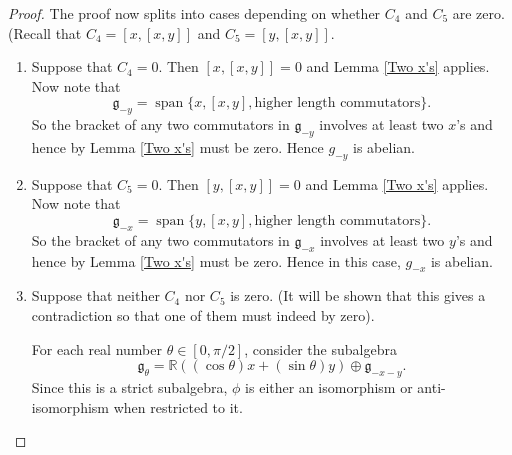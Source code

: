\documentclass[honours]{UNSWthesis}
\newcommand{\R}{\mathbb{R}}
\newcommand{\g}{\mathfrak{g}}
\newcommand{\1}{\mathbf{e}_{1}}
\newcommand{\2}{\mathbf{e}_{3}}
\newcommand{\3}{\mathbf{e}_{3}}
\DeclareMathOperator{\spn}{span}
\begin{document}
\begin{proof}
The proof now splits into cases depending on whether $C_{4}$ and $C_{5}$ are zero. (Recall that $C_4=[x,[x,y]]$ and $C_5 = [y,[x,y]]$.


\begin{enumerate}
\item Suppose that $C_4=0$. Then $[x,[x,y]]=0$ and Lemma \ref{Two x's} applies. Now note that 
\[
\g_{-y} = \spn \{ x, [x,y], \text{higher length commutators}\}.
\]
So the bracket of any two commutators in $\g_{-y}$ involves at least two $x$'s and hence by Lemma \ref{Two x's} must be zero. Hence $g_{-y}$ is abelian. 

\item Suppose that $C_5=0$. Then $[y,[x,y]]=0$ and Lemma \ref{Two x's} applies. Now note that 
\[
\g_{-x} = \spn \{ y, [x,y], \text{higher length commutators}\}.
\]
So the bracket of any two commutators in $\g_{-x}$ involves at least two $y$'s and hence by Lemma \ref{Two x's} must be zero. Hence in this case, $g_{-x}$ is abelian.

\item Suppose that neither $C_4$ nor $C_5$ is zero. (It will be shown that this gives a contradiction so that one of them must indeed by zero). 

For each real number $\theta \in [0,\pi/2]$, consider the subalgebra 
\[
\g_\theta= \R((\cos{\theta})x + (\sin{\theta})y) \oplus \g_{-x-y}.
\]
Since this is a strict subalgebra, $\phi$ is either an isomorphism or anti-isomorphism when restricted to it. 


\end{enumerate}
\end{proof}
\end{document}
